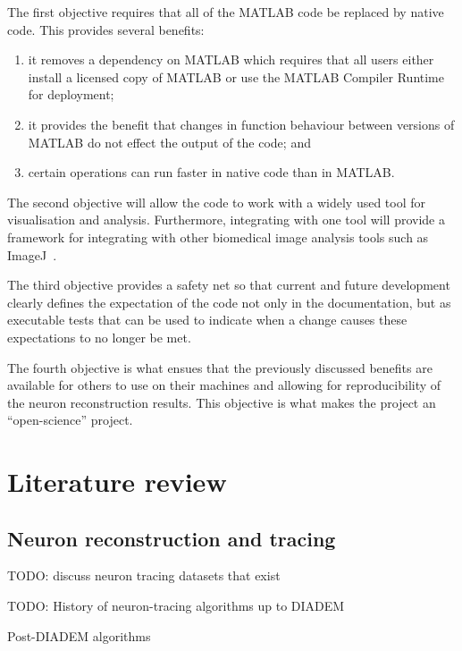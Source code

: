 The first objective requires that all of the MATLAB code be
replaced by native code. This provides several benefits:
\begin{enumerate}[label={\alph*)}]
	\item it removes a dependency on MATLAB which requires that
		all users either install a licensed copy of MATLAB
		or use the MATLAB Compiler Runtime for deployment;
	\item it provides the benefit that changes in
		function behaviour between versions of
		MATLAB do not effect the output of the
		code; and
	\item certain operations can run faster in native code than
		in MATLAB.
\end{enumerate}

The second objective will allow the code to work with a widely used
tool for visualisation and analysis. Furthermore, integrating with
one tool will provide a framework for integrating with other
biomedical image analysis tools such as ImageJ~\autocite{Schneider2012}.

The third objective provides a safety net so that current and
future development clearly defines the expectation of the code
not only in the documentation, but as executable tests that can be
used to indicate when a change causes these expectations to no
longer be met.

The fourth objective is what ensues that the previously discussed
benefits are available for others to use on their machines and
allowing for reproducibility of the neuron reconstruction results.
This objective is what makes the project an ``open-science''
project.

\section{Literature review}

\subsection{Neuron reconstruction and tracing}\label{subsec:neuron-tracing}

TODO: discuss neuron tracing datasets that exist
~\autocite{Duke-Southampton-archive:Cannon:1998,DIADEM-dataset:Brown:2011}

TODO: History of neuron-tracing algorithms up to DIADEM
~\autocite{DIADEM&Beyond:Liu:2011,NeuroMorphTrends:Halavi:2012,NeuroTracePerspect:Meijering:2010}

Post-DIADEM algorithms
~\autocite{Bauer2010,MIA-anisotropic-path-searching-Xie2011,MICCAI-anisotropic-path-searching-Xie2010,
Jeong2015,Luo2015,De2015,Gulyanon2015,ORION_Santamaria-Pang2015,Mukherjee2014,Hernandez-Herrera2014,Basu2014,Xiao2013,Jimenez2013,Basu2013,Mukherjee2013,Hernandez-Herrera2013,Ming2013,Lee2012,Czarnecki2012}


